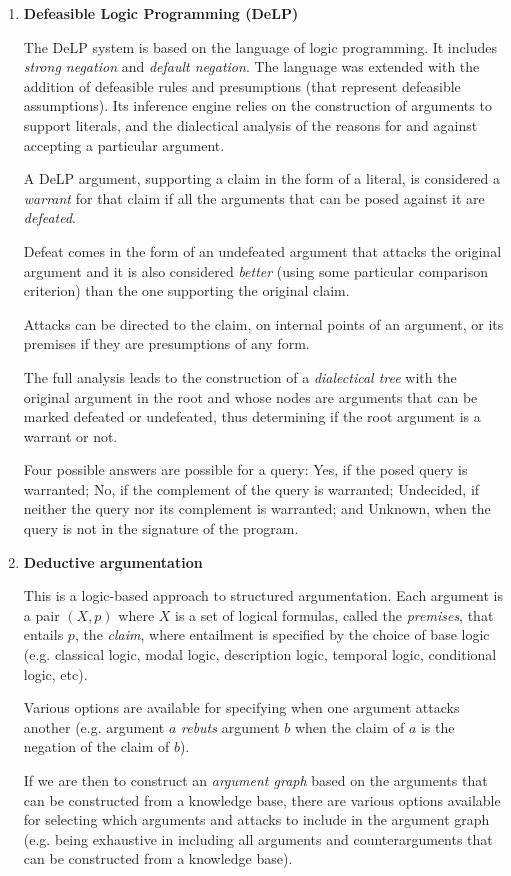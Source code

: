 \begin{enumerate}[itemsep=5pt,parsep=5pt,leftmargin=3em,topsep=5pt,label=(\arabic*)]
    \item 
    \textbf{Defeasible Logic Programming (DeLP) }

    The DeLP system is based on the language of logic programming. 
    It includes \textit{strong negation} and \textit{default negation}. 
    The language was extended with the addition of defeasible rules and presumptions (that represent defeasible assumptions). Its inference engine relies on the construction of arguments to support literals, and the dialectical analysis of the reasons for and against accepting a particular argument. 
    
    A DeLP argument, 
    supporting a claim in the form of a literal, 
    is considered a \textit{warrant} for that claim if all the arguments that can be posed against it are \textit{defeated}.
    
    Defeat comes in the form of an undefeated argument that attacks the original argument and it is also considered \textit{better} (using some particular comparison criterion) than the one supporting the original claim. 
    
    Attacks can be directed to the claim, on internal points of an argument, or its premises if they are presumptions of any form. 
    
    The full analysis leads to the construction of a \textit{dialectical tree} with the original argument in the root and whose nodes are arguments that can be marked defeated or undefeated, thus determining if the root argument is a warrant or not. 
    
    Four possible answers are possible for a query: 
    Yes, if the posed query is warranted; 
    No, if the complement of the query is warranted; 
    Undecided, if neither the query nor its complement is warranted; 
    and Unknown, when the query is not in the signature of the program.


    \item 
    \textbf{Deductive argumentation} 

    This is a logic-based approach to structured argumentation. 
    Each argument is a pair $(X, p)$ where $X$ is a set of logical formulas, called the \textit{premises}, 
    that entails $p$, the \textit{claim}, where entailment is specified by the choice of base logic (e.g. classical logic, modal logic, description logic, temporal logic, conditional logic, etc). 
    
    Various options are available for specifying when one argument attacks another (e.g. argument $a$ \textit{rebuts} argument $b$ when the claim of $a$ is the negation of the claim of $b$). 
    
    If we are then to construct an \textit{argument graph} based on the arguments that can be constructed from a knowledge base, 
    there are various options available for selecting which arguments and attacks to include in the argument graph (e.g. being exhaustive in including all arguments and counterarguments that can be constructed from a knowledge base).
\end{enumerate}



